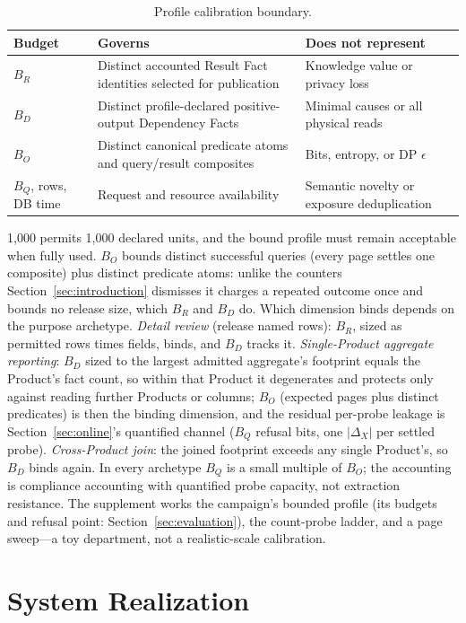 \documentclass[10pt,journal,compsoc]{IEEEtran}
\begin{document}
\begin{table}[t]
\centering
\caption{Profile calibration boundary.}
\label{tab:profile-calibration}
\scriptsize
\setlength{\tabcolsep}{2.5pt}
\begin{tabular}{L{0.16\columnwidth}L{0.42\columnwidth}L{0.30\columnwidth}}
\toprule
Budget & Governs & Does not represent \\
\midrule
$B_R$ & Distinct accounted Result Fact identities selected for publication & Knowledge value or privacy loss \\
$B_D$ & Distinct profile-declared positive-output Dependency Facts & Minimal causes or all physical reads \\
$B_O$ & Distinct canonical predicate atoms and query/result composites & Bits, entropy, or DP $\epsilon$ \\
$B_Q$, rows, DB time & Request and resource availability & Semantic novelty or exposure deduplication \\
\bottomrule
\end{tabular}
\end{table}
 1,000
permits 1,000 declared units, and the bound profile must remain acceptable
when fully used. $B_O$ bounds distinct successful queries (every page
settles one composite) plus distinct predicate atoms: unlike the counters
Section~\ref{sec:introduction} dismisses it charges a repeated outcome once
and bounds no release size, which $B_R$ and $B_D$ do. Which dimension binds
depends on the purpose archetype. \emph{Detail review} (release named
rows): $B_R$, sized as permitted rows times fields, binds, and $B_D$ tracks
it. \emph{Single-Product aggregate reporting}: $B_D$ sized to the largest
admitted aggregate's footprint equals the Product's fact count, so within
that Product it degenerates and protects only against reading further
Products or columns; $B_O$ (expected pages plus distinct predicates) is
then the binding dimension, and the residual per-probe leakage is
Section~\ref{sec:online}'s quantified channel ($B_Q$ refusal bits, one
$|\Delta_X|$ per settled probe). \emph{Cross-Product join}: the joined
footprint exceeds any single Product's, so $B_D$ binds again. In every
archetype $B_Q$ is a small multiple of $B_O$; the accounting is compliance
accounting with quantified probe capacity, not extraction resistance. The
supplement works the campaign's bounded profile (its budgets and refusal
point: Section~\ref{sec:evaluation}), the count-probe ladder, and a page
sweep---a toy department, not a realistic-scale calibration.

\section{System Realization}
\label{sec:system}
\end{document}
